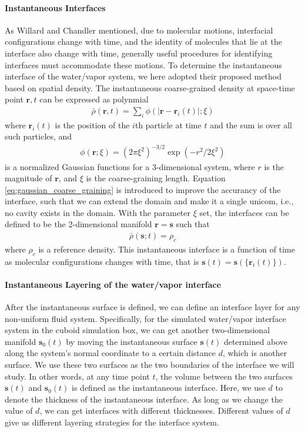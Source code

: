 {\paragraph{Instantaneous Interfaces}
As Willard and Chandler mentioned, due to molecular motions, interfacial configurations
change with time, and the identity of molecules that lie at the interface also change with time, generally useful procedures for
identifying interfaces must accommodate these motions. \cite{Willard2010} 
To determine the instantaneous interface of the water/vapor system, we here adopted their proposed method based on spatial density.
The instantaneous coarse-grained density at space-time point $\mathbf{r},t$ can be expressed as polynmial
\begin{eqnarray}
\bar{\rho}(\mathbf{r}, t)=\sum_{i} \phi(|\mathbf{r}-\mathbf{r}_{i}(t)|; \xi) 
\end{eqnarray}
where ${\mathbf{r}}_i(t)$ is the position of the $i$th particle at time $t$ and the sum is over all such particles, and 
\begin{eqnarray}
\phi(\mathbf{r};\xi)=(2 \pi \xi^{2})^{-3/ 2} \exp (-r^{2} / 2 \xi^{2}) 
\label{eq:gaussian_coarse_graining}
\end{eqnarray} 
is a normalized Gaussian functions for a 3-dimensional system, where $r$ is the magnitude of ${\mathbf r}$, and $\xi$ is the coarse-graining length.
Equation \ref{eq:gaussian_coarse_graining} is introduced to improve the accurancy of the interface, such that we can extend the domain and make it a single unicom,
i.e., no cavity exists in the domain.
With the parameter $\xi$ set, the interfaces can be defined to be the 2-dimensional manifold ${\mathbf r} = {\mathbf s}$ such that
\begin{eqnarray}
\bar\rho(\mathbf{s};t)= \rho_c 
\label{eq:rho_c}
\end{eqnarray} 
where $\rho_c$ is a reference density. This instantaneous interface is a function of time as molecular configurations changes with time, that is 
${\mathbf s}(t) = {\mathbf s}(\{{\mathbf r}_i(t)\})$. 

\paragraph{Instantaneous Layering of the water/vapor interface}
After the instantaneous surface is defined, we can define an interface layer for any non-uniform fluid system. 
Specifically, for the simulated water/vapor interface system in the cuboid simulation box, 
we can get another two-dimensional manifold ${\mathbf s}_0(t)$ by moving the instantaneous surface ${\mathbf s}(t)$ determined above 
along the system's normal coordinate to a certain distance $d$, which is another surface. We use these two surfaces 
as the two boundaries of the interface we will study. In other words, at any time point $t$, the volume between the two surfaces 
${\mathbf s}(t)$ and ${\mathbf s}_0(t)$ is defined as the instantaneous interface. 
Here, we use $d$ to denote the thickness of the instantaneous interface. As long as we change the value of $d$, we can get interfaces with different thicknesses. 
Different values of $d$ give us different layering strategies for the interface system.

}
